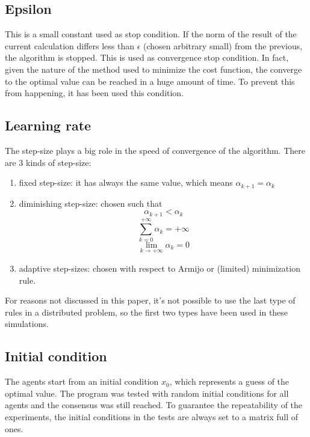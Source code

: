 \documentclass[a4paper,11pt,oneside]{book}
\begin{document}
\subsection{Epsilon} \label{Subsec2.2.2}
This is a small constant used as stop condition. If the norm of the result of the current calculation differs less than $\epsilon$ (chosen arbitrary small) from the previous, the algorithm is stopped. This is used as convergence stop condition. In fact, given the nature of the method used to minimize the cost function, the converge to the optimal value can be reached in a huge amount of time. To prevent this from happening, it has been used this condition.

\subsection{Learning rate} \label{Subsec2.2.3}
The step-size plays a big role in the speed of convergence of the algorithm. There are 3 kinds of step-size:
\begin{enumerate}
	\item fixed step-size: it has always the same value, which means $\alpha_{k+1} = \alpha_k$
	\item diminishing step-size: chosen such that 
	\begin{equation}
	\alpha_{k+1} < \alpha_k
	\end{equation}
	\begin{equation}
	\sum_{k=0}^{+\infty} \alpha_k = +\infty
	\end{equation}
	\begin{equation}
	\lim\limits_{k \to +\infty} \alpha_k = 0
	\end{equation}
	\item adaptive step-sizes: chosen with respect to Armijo or (limited) minimization rule.
\end{enumerate}
For reasons not discussed in this paper, it's not possible to use the last type of rules in a distributed problem, so the first two types have been used in these simulations.

\subsection{Initial condition} \label{Subsec2.2.4}
The agents start from an initial condition $x_0$, which represents a guess of the optimal value. The program was tested with random initial conditions for all agents and the consensus was still reached. To guarantee the repeatability of the experiments, the initial conditions in the tests are always set to a matrix full of ones.
\end{document}
